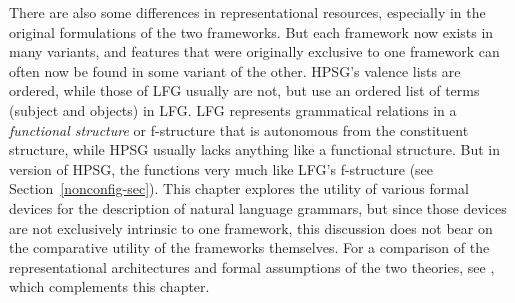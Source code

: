 There are also some differences in representational resources, especially in the original formulations of the two frameworks.
But each framework now exists in many variants, and features that were originally exclusive to one framework can often now be found in some variant of the other.   HPSG's valence lists are ordered, while those of LFG usually are not, but \citet{andrews1999complex} use an ordered list of terms (subject and objects) in LFG.  
LFG represents grammatical relations in a \textit{functional structure} or f-structure that is autonomous from the constituent structure, while HPSG usually lacks anything like a functional structure. 
But in  
version of HPSG, the \compsl functions very much like LFG's f-structure (see Section~\ref{nonconfig-sec}).  This chapter explores the utility of various formal devices for the description of natural language grammars, but since those devices are not exclusively intrinsic to one framework, this discussion does not bear on the comparative utility of the frameworks themselves. For a comparison of the representational architectures and formal assumptions of the two theories, see \citet{Przepiorkowski2021a}, which complements this chapter. 



